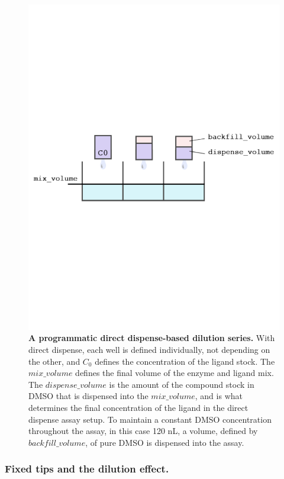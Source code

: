 \documentclass[aps,pre,twocolumn,nofootinbib,superscriptaddress,linenumbers]{revtex4-1}
\begin{document}
\begin{figure}[tb]
    \includegraphics[trim={0 9cm 0 9cm},clip,width=\columnwidth]{../figures/direct_dispense.pdf}

  \caption{{\bf A programmatic direct dispense-based dilution series.}
  With direct dispense, each well is defined individually, not depending on the other, and $C_0$ defines the concentration of the ligand stock. 
  The $mix\_volume$ defines the final volume of the enzyme and ligand mix. 
  The $dispense\_volume$ is the amount of the compound stock in DMSO that is dispensed into the $mix\_volume$, and is what determines the final concentration of the ligand in the direct dispense assay setup. 
  To maintain a constant DMSO concentration throughout the assay, in this case 120 nL, a volume, defined by $backfill\_volume$, of pure DMSO is dispensed into the assay.
  }
  \label{fig:direct_dispense}
\end{figure}

\subsubsection*{Fixed tips and the dilution effect.}
\end{document}
